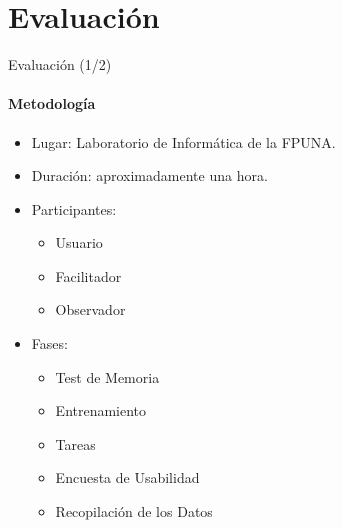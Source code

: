 \section*{Evaluaci\'on}

\begin{frame}{Evaluaci\'on (1/2)}
\framesubtitle{Metodolog\'ia}


\begin{itemize}
    \vfill \item<+->{ Lugar: Laboratorio de Inform\'atica de la FPUNA.}
    \vfill \item<+->{ Duraci\'on: aproximadamente una hora. } 
    \vfill \item<+->{ Participantes:}
        \begin{itemize}
            \vfill \item<+->{ Usuario }
            \vfill \item<+->{ Facilitador }
            \vfill \item<+->{ Observador }
        \end{itemize}
    \vfill \item<+->{ Fases: }
        \begin{itemize}
            \vfill \item<+->{ Test de Memoria }
            \vfill \item<+->{ Entrenamiento }
            \vfill \item<+->{ Tareas }
            \vfill \item<+->{ Encuesta de Usabilidad }
            \vfill \item<+->{ Recopilaci\'on de los Datos }
        \end{itemize}   
\end{itemize}
\end{frame}


